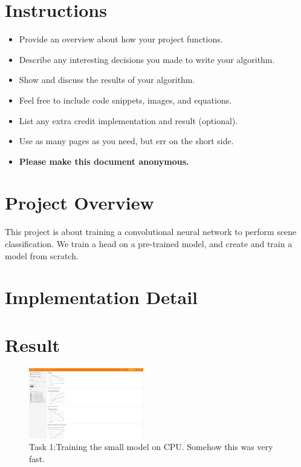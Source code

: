 \section*{Instructions}
\begin{itemize}
  \item Provide an overview about how your project functions. 
  \item Describe any interesting decisions you made to write your algorithm.
  \item Show and discuss the results of your algorithm.
  \item Feel free to include code snippets, images, and equations.
  \item List any extra credit implementation and result (optional).
  \item Use as many pages as you need, but err on the short side.
  \item \textbf{Please make this document anonymous.}
\end{itemize}

\section*{Project Overview}

This project is about training a convolutional neural network to perform scene
classification. We train a head on a pre-trained model, and create and train a
model from scratch.

\section*{Implementation Detail}

\section*{Result}

\begin{figure}[h]
    \centering
    \includegraphics[width=5cm]{task1v0-2.png}
    \caption{Task 1:Training the small model on CPU. Somehow this was very fast.}
    \label{fig:result1}
\end{figure}



